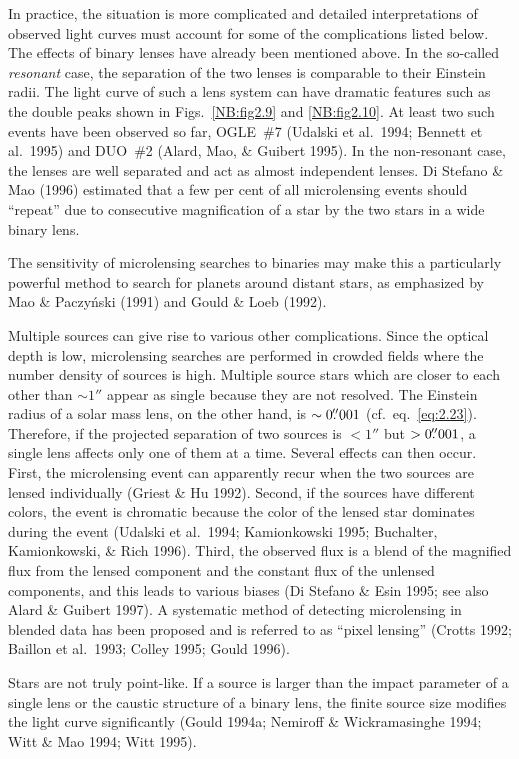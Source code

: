 \documentclass[a4paper,10pt]{article} %
\newcommand{\farcs}{\hbox{$.\!\!^{\prime\prime}$}}
\begin{document}
In practice, the situation is more complicated and detailed
interpretations of observed light curves must account for some of the
complications listed below. The effects of binary lenses have already
been mentioned above. In the so-called {\em resonant\/} case, the
separation of the two lenses is comparable to their Einstein radii.
The light curve of such a lens system can have dramatic features such
as the double peaks shown in Figs.\ \ref{NB:fig2.9} and
\ref{NB:fig2.10}. At least two such events have been observed so far,
OGLE~\#7 (Udalski et al.\ 1994; Bennett et al.\ 1995) and DUO~\#2
(Alard, Mao, \& Guibert 1995). In the non-resonant case, the lenses
are well separated and act as almost independent lenses. Di Stefano \&
Mao (1996) estimated that a few per cent of all microlensing events
should ``repeat'' due to consecutive magnification of a star by the
two stars in a wide binary lens.

The sensitivity of microlensing searches to binaries may make this a
particularly powerful method to search for planets around distant
stars, as emphasized by Mao \& Paczy\'nski (1991) and Gould \& Loeb
(1992).

Multiple sources can give rise to various other complications. Since
the optical depth is low, microlensing searches are performed in
crowded fields where the number density of sources is high. Multiple
source stars which are closer to each other than $\sim1''$ appear as
single because they are not resolved. The Einstein radius of a solar
mass lens, on the other hand, is $\sim0\farcs001$ (cf.\ eq.\
\ref{eq:2.23}). Therefore, if the projected separation of two sources
is $<1''$ but $>0\farcs001$, a single lens affects only one of them at
a time. Several effects can then occur. First, the microlensing event
can apparently recur when the two sources are lensed individually
(Griest \& Hu 1992). Second, if the sources have different colors, the
event is chromatic because the color of the lensed star dominates
during the event (Udalski et al.\ 1994; Kamionkowski 1995; Buchalter,
Kamionkowski, \& Rich 1996). Third, the observed flux is a blend of
the magnified flux from the lensed component and the constant flux of
the unlensed components, and this leads to various biases (Di Stefano
\& Esin 1995; see also Alard \& Guibert 1997). A systematic method of
detecting microlensing in blended data has been proposed and is
referred to as ``pixel lensing'' (Crotts 1992; Baillon et al.\ 1993;
Colley 1995; Gould 1996).

Stars are not truly point-like. If a source is larger than the impact
parameter of a single lens or the caustic structure of a binary lens,
the finite source size modifies the light curve significantly (Gould
1994a; Nemiroff \& Wickramasinghe 1994; Witt \& Mao 1994; Witt 1995).
\end{document}
